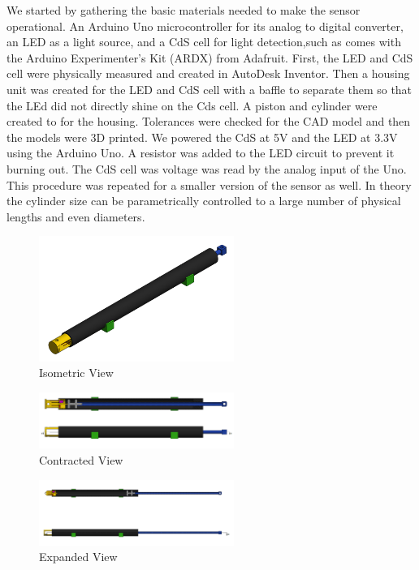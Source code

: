 \documentclass[10pt,conference,compsocconf]{IEEEtran}
\begin{document}
We started by gathering the basic materials needed to make the sensor operational. An Arduino Uno microcontroller for its analog to digital converter, an LED as a light source, and a CdS cell for light detection,such as comes with the Arduino Experimenter’s Kit (ARDX) from Adafruit. First, the LED and CdS cell were physically measured and created in AutoDesk Inventor. Then a housing unit was created for the LED and CdS cell with a baffle to separate them so that the LEd did not directly shine on the Cds cell. A piston and cylinder were created to for the housing. Tolerances were checked for the CAD model and then the models were 3D printed. We powered the CdS at 5V and the LED at 3.3V using the Arduino Uno. A resistor was added to the LED circuit to prevent it burning out. The CdS cell was voltage was read by the analog input of the Uno. This procedure was repeated for a smaller version of the sensor as well. In theory the cylinder size can be parametrically controlled to a large number of physical lengths and even diameters.

\begin{figure}
  \centering
  \includegraphics[width=2.5in]{figures/IsometricView.png}
  \caption{Isometric View}  
\end{figure}

\begin{figure}
  \centering
  \includegraphics[width=2.5in]{figures/Contracted.png}
  \caption{Contracted View}  
\end{figure}

\begin{figure}
  \centering
  \includegraphics[width=2.5in]{figures/Expanded.png}
  \caption{Expanded View}  
\end{figure}
\end{document}
